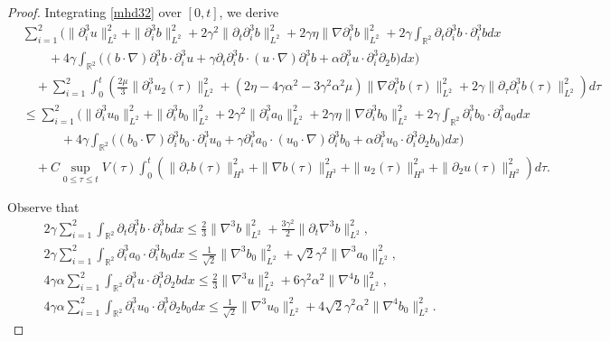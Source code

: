 \documentclass[reqno,11pt]{amsart}
\def\R{\mathbb R}
\numberwithin{Thm}{section}
\begin{document}
\begin{proof}
 Integrating \eqref{mhd32} over $[0,t]$, we derive
\begin{align}\label{s1}
&\sum_{i=1}^2\Big(\|\partial_i^3 u\|^2_{L^2}+\|\partial_i^3 b\|^2_{L^2}+2\gamma^2\|\partial_t\partial_i^3b\|^2_{L^2}
+2\gamma\eta\|\nabla\partial_i^3 b\|^2_{L^2}+2\gamma\int_{\R^2}\partial_t\partial_i^3b\cdot\partial_i^3bdx
\nonumber\\
&\quad\quad+4\gamma\int_{\R^2}\big((b\cdot\nabla)\partial_i^3 b\cdot\partial_i^3 u+\gamma\partial_{t}\partial_i^3b\cdot (u\cdot\nabla)\partial_i^3 b+\alpha\partial_i^3u\cdot\partial_i^3\partial_2 b\big)dx\Big)\nonumber\\
&\quad+\sum_{i=1}^2\int_{0}^t\left(\frac{2\mu}{3}\|\partial_i^3u_2(\tau)\|^2_{L^2}+(2\eta-4\gamma\alpha^2-3\gamma^2\alpha^2\mu)\|\nabla\partial_i^3b(\tau)\|^2_{L^2}+2\gamma\|\partial_{\tau}\partial_i^3b(\tau)\|^2_{L^2}\right)d\tau\nonumber\\
&\leq \sum_{i=1}^2\Big(\|\partial_i^3 u_0\|^2_{L^2}+\|\partial_i^3 b_0\|^2_{L^2}+2\gamma^2\|\partial_i^3a_0\|^2_{L^2}
+2\gamma\eta\|\nabla\partial_i^3 b_0\|^2_{L^2}+2\gamma\int_{\R^2}\partial_i^3b_0\cdot\partial_i^3a_0dx
\nonumber\\
&\quad\qquad+4\gamma\int_{\R^2}\big((b_0\cdot\nabla)\partial_i^3 b_0\cdot\partial_i^3 u_0+\gamma\partial_i^3a_0\cdot (u_0\cdot\nabla)\partial_i^3 b_0+\alpha\partial_i^3u_0\cdot\partial_i^3\partial_2 b_0\big)dx\Big)\nonumber\\
&\quad+C\sup_{0\leq\tau\leq t}V(\tau)\int_{0}^t\left(\|\partial_{\tau} b(\tau)\|_{H^3}^2+\|\nabla b(\tau)\|_{H^3}^2+\|u_2(\tau)\|_{H^3}^2+\|\partial_{2}u(\tau)\|_{H^2}^2\right)d\tau.
\end{align}



 Observe that
\begin{align}
&2\gamma\sum_{i=1}^2\int_{\R^2}\partial_t\partial_i^3b\cdot\partial_i^3bdx
\leq \frac{2}{3}\|\nabla^3b\|_{L^2}^2+\frac{3\gamma^2}{2}\|\partial_t\nabla^3 b\|_{L^2}^2,\label{Y1}\\
&2\gamma\sum_{i=1}^2\int_{\R^2}\partial_i^3a_0\cdot\partial_i^3b_0dx
\leq \frac{1}{\sqrt{2}}\|\nabla^3b_0\|_{L^2}^2+\sqrt{2}\gamma^2\|\nabla^3a_0\|_{L^2}^2,\label{Y2}\\
&4\gamma\alpha\sum_{i=1}^2\int_{\R^2}\partial_i^3u\cdot\partial_i^3\partial_2bdx
\leq \frac{2}{3}\|\nabla^3u\|_{L^2}^2+6\gamma^2\alpha^2\|\nabla^4 b\|_{L^2}^2,\label{Y3}\\
&4\gamma\alpha\sum_{i=1}^2\int_{\R^2}\partial_i^3u_0\cdot\partial_i^3\partial_2b_0dx
\leq \frac{1}{\sqrt{2}}\|\nabla^3u_0\|_{L^2}^2+4\sqrt{2}\gamma^2\alpha^2\|\nabla^4 b_0\|_{L^2}^2.\label{Y4}
\end{align}



\end{proof}
\end{document}
